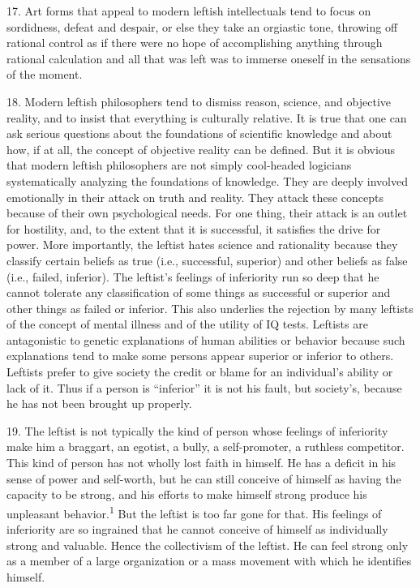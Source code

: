 \documentclass{article}
\begin{document}
17. Art forms that appeal to modern leftish intellectuals tend to focus on sordidness, defeat and 
despair, or else they take an orgiastic tone, throwing off rational control as if there were no hope 
of accomplishing anything through rational calculation and all that was left was to immerse oneself 
in the sensations of the moment. \vspace{\baselineskip}

18. Modern leftish philosophers tend to dismiss reason, science, and objective reality, and to insist 
that everything is culturally relative.  It is true that one can ask serious questions about the 
foundations of scientific knowledge and about how, if at all, the concept of objective reality can 
be defined. But it is obvious that modern leftish philosophers are not simply cool-headed logicians 
systematically analyzing the foundations of knowledge. They are deeply involved emotionally in 
their attack on truth and reality. They attack these concepts because of their own psychological 
needs. For one thing, their attack is an outlet for hostility, and, to the extent that it is successful, it 
satisfies the drive for power. More importantly, the leftist hates science and rationality because 
they classify certain beliefs as true (i.e., successful, superior) and other beliefs as false (i.e., failed, 
inferior). The leftist’s feelings of inferiority run so deep that he cannot tolerate any classification 
of some things as successful or superior and other things as failed or inferior. This also underlies 
the rejection by many leftists of the concept of mental illness and of the utility of IQ tests. Leftists 
are antagonistic to genetic explanations of human abilities or behavior because such explanations 
tend to make some persons appear superior or inferior to others. Leftists prefer to give society the 
credit or blame for an individual’s ability or lack of it. Thus if a person is “inferior” it is not his 
fault, but society’s, because he has not been brought up properly. \vspace{\baselineskip}

19. The leftist is not typically the kind of person whose feelings of inferiority make him a braggart,
an egotist, a bully, a self-promoter, a ruthless competitor. This kind of person has not wholly lost 
faith in himself. He has a deficit in his sense of power and self-worth, but he can still conceive of 
himself as having the capacity to be strong, and his efforts to make himself strong produce his 
unpleasant behavior.\textsuperscript{1} But the leftist is too far gone for that. His feelings of inferiority are so 
ingrained that he cannot conceive of himself as individually strong and valuable. Hence the 
collectivism of the leftist. He can feel strong only as a member of a large organization or a mass 
movement with which he identifies himself. \vspace{\baselineskip}
\end{document}
